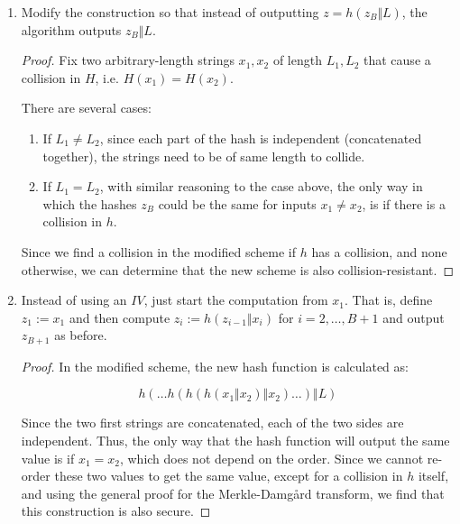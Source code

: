 \documentclass{article}
\begin{document}
\begin{enumerate}
\begin{enumerate}
\begin{proof}
          However, since we have no record of length, and we pad all the
          strings with zeroes, once they are padded, we don't know them apart,
          and we have a collision in $H$, i.e $H(x_1) = H(x_2)$. Thus, this 
          variant is \textit{not} collision-resistant.
        \end{proof}

      \item Modify the construction so that instead of outputting $z = h(z_B
        \Vert L)$, the algorithm outputs $z_B \Vert L$.

        \begin{proof}
          Fix two arbitrary-length strings $x_1, x_2$ of length $L_1, L_2$ that 
          cause a collision in $H$, i.e. $H(x_1) = H(x_2)$.

          There are several cases:
          \begin{enumerate}
            \item If $L_1 \neq L_2$, since each part of the hash is independent
              (concatenated together), the strings need to be of same length to
              collide.
            \item If $L_1 = L_2$, with similar reasoning to the case above, the
              only way in which the hashes $z_B$ could be the same for inputs
              $x_1 \neq x_2$, is if there is a collision in $h$.
          \end{enumerate}

          Since we find a collision in the modified scheme if $h$ has a
          collision, and none otherwise, we can determine that the new scheme is
          also collision-resistant.
        \end{proof}

      \item Instead of using an $IV$, just start the computation from $x_1$.
        That is, define $z_1 := x_1$ and then compute $z_i := h(z_{i - 1} \Vert
        x_i)$ for $i = 2, \dots, B + 1$ and output $z_{B + 1}$ as before.

        \begin{proof}
          In the modified scheme, the new hash function is calculated as:

          \[
            h(\dots h(h(h(x_1 \Vert x_2) \Vert x_2) \dots )\Vert L)
          \]

          Since the two first strings are concatenated, each of the two sides
          are independent. Thus, the only way that the hash function will output
          the same value is if $x_1 = x_2$, which does not depend on the order.
          Since we cannot re-order these two values to get the same value,
          except for a collision in $h$ itself, and using the general proof for
          the Merkle-Damg\aa rd transform, we find that this construction is
          also secure.
        \end{proof}


\end{enumerate}
\end{enumerate}
\end{document}
